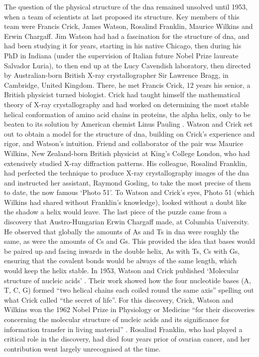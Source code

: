 The question of the physical structure of the \gls{dna} remained unsolved until 1953, when a team of scientists at last proposed its structure. 
Key members of this team were Francis Crick, James Watson, Rosalind Franklin, Maurice Wilkins and Erwin Chargaff. 
Jim Watson had had a fascination for the structure of \gls{dna}, and had been studying it for years, starting in his native Chicago, then during his PhD in Indiana (under the supervision of Italian future Nobel Prize laureate Salvador Luria), to then end up at the Lucy Cavendish laboratory, then directed by Australian-born British X-ray crystallographer Sir Lawrence Bragg, in Cambridge, United Kingdom. 
There, he met Francis Crick, 12 years his senior, a British physicist turned biologist. 
Crick had taught himself the mathematical theory of X-ray crystallography and had worked on determining the most stable helical conformation of amino acid chains in proteins, the alpha helix, only to be beaten to its solution by American chemist Linus Pauling \cite{pauling1951structure}. 
Watson and Crick set out to obtain a model for the structure of \gls{dna}, building on Crick’s experience and rigor, and Watson’s intuition. 
Friend and collaborator of the pair was Maurice Wilkins, New Zealand-born British physicist at King’s College London, who had extensively studied X-ray diffraction patterns. 
His colleague, Rosalind Franklin, had perfected the technique to produce X-ray crystallography images of the \gls{dna} and instructed her assistant, Raymond Gosling, to take the most precise of them to date, the now famous `Photo 51'. 
To Watson and Crick’s eyes, Photo 51 (which Wilkins had shared without Franklin's knowledge), looked without a doubt like the shadow a helix would leave. 
The last piece of the puzzle came from a discovery that Austro-Hungarian Erwin Chargaff made, at Columbia University. 
He observed that globally the amounts of As and Ts in \gls{dna} were roughly the same, as were the amounts of Cs and Gs. 
This provided the idea that bases would be paired up and facing inwards in the double helix, As with Ts, Cs with Gs, ensuring that the covalent bonds would be always of the same length, which would keep the helix stable. 
In 1953, Watson and Crick published `Molecular structure of nucleic acids' \cite{watson1953molecular}. 
Their work showed how the four nucleotide bases (A, T, C, G) formed “two helical chains each coiled round the same axis” \cite{watson1953molecular} spelling out what Crick called “the secret of life”. 
For this discovery, Crick, Watson and Wilkins won the 1962 Nobel Prize in Physiology or Medicine “for their discoveries concerning the molecular structure of nucleic acids and its significance for information transfer in living material” \cite{nobel1962nobel}. 
Rosalind Franklin, who had played a critical role in the discovery, had died four years prior of ovarian cancer, and her contribution went largely unrecognised at the time.

